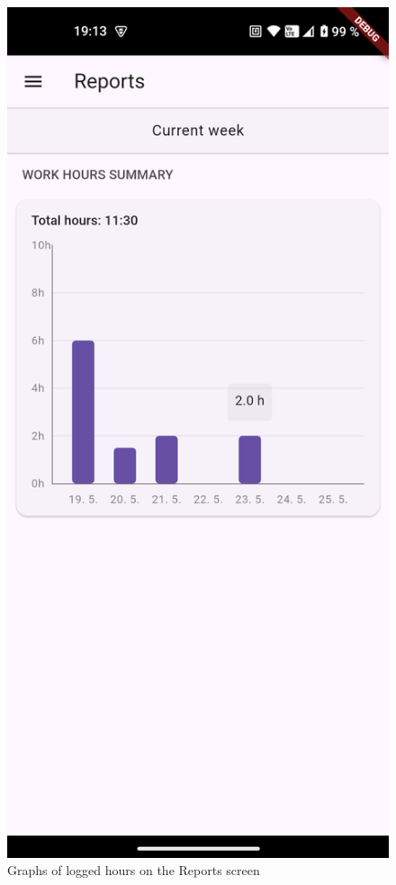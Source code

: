 \documentclass[
  digital,     %
  oneside,     %
  nosansbold,  %
  nocolorbold, %
  lof,         %
  lot,         %
]{fithesis4}
\begin{document}
\begin{center}
\begin{minipage}{0.45\textwidth}
  \begin{figure}[H]
    \centering
    \includegraphics[width=\textwidth]{assets/reports_screen.png}
    \caption{Graphs of logged hours on the Reports screen}
    \label{fig:reports_screen}
  \end{figure}
\end{minipage}
\hspace{0.05\textwidth}
\begin{minipage}{0.45\textwidth}

\end{minipage}
\end{center}
\end{document}
